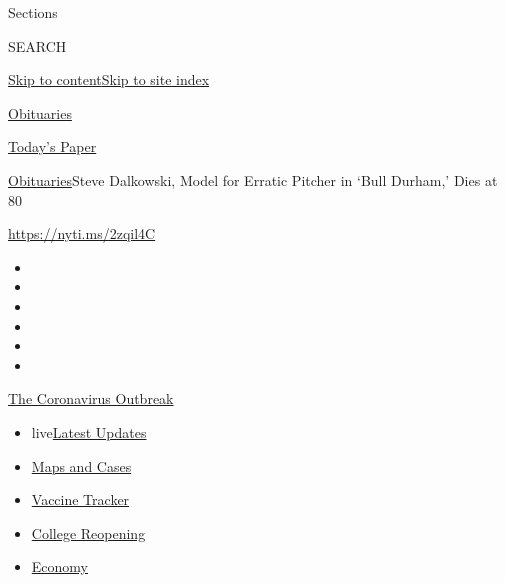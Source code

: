 Sections

SEARCH

\protect\hyperlink{site-content}{Skip to
content}\protect\hyperlink{site-index}{Skip to site index}

\href{https://www.nytimes.com/section/obituaries}{Obituaries}

\href{https://myaccount.nytimes.com/auth/login?response_type=cookie\&client_id=vi}{}

\href{https://www.nytimes.com/section/todayspaper}{Today's Paper}

\href{/section/obituaries}{Obituaries}\textbar{}Steve Dalkowski, Model
for Erratic Pitcher in `Bull Durham,' Dies at 80

\url{https://nyti.ms/2zqil4C}

\begin{itemize}
\item
\item
\item
\item
\item
\item
\end{itemize}

\href{https://www.nytimes.com/news-event/coronavirus?action=click\&pgtype=Article\&state=default\&region=TOP_BANNER\&context=storylines_menu}{The
Coronavirus Outbreak}

\begin{itemize}
\tightlist
\item
  live\href{https://www.nytimes.com/2020/08/03/world/coronavirus-covid-19.html?action=click\&pgtype=Article\&state=default\&region=TOP_BANNER\&context=storylines_menu}{Latest
  Updates}
\item
  \href{https://www.nytimes.com/interactive/2020/us/coronavirus-us-cases.html?action=click\&pgtype=Article\&state=default\&region=TOP_BANNER\&context=storylines_menu}{Maps
  and Cases}
\item
  \href{https://www.nytimes.com/interactive/2020/science/coronavirus-vaccine-tracker.html?action=click\&pgtype=Article\&state=default\&region=TOP_BANNER\&context=storylines_menu}{Vaccine
  Tracker}
\item
  \href{https://www.nytimes.com/2020/08/02/us/covid-college-reopening.html?action=click\&pgtype=Article\&state=default\&region=TOP_BANNER\&context=storylines_menu}{College
  Reopening}
\item
  \href{https://www.nytimes.com/live/2020/08/03/business/stock-market-today-coronavirus?action=click\&pgtype=Article\&state=default\&region=TOP_BANNER\&context=storylines_menu}{Economy}
\end{itemize}

